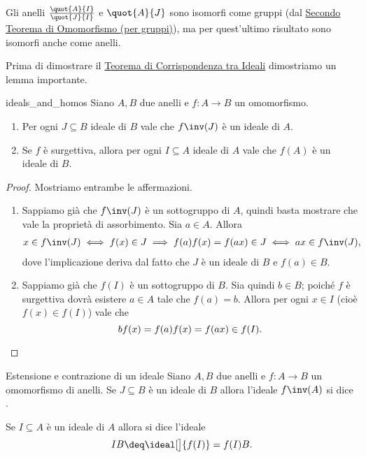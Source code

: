 \begin{remark}
    Gli anelli $\frac{\quot{A}{I}}{\quot{J}{I}}$ e $\quot{A}{J}$ sono isomorfi come gruppi (dal \hyperref[th:second_iso]{Secondo Teorema di Omomorfismo (per gruppi)}), ma per quest'ultimo risultato sono isomorfi anche come anelli.
\end{remark}

Prima di dimostrare il \hyperref[th:ideal_corr]{Teorema di Corrispondenza tra Ideali} dimostriamo un lemma importante.
\begin{lemma}{}
    {ideals_and_homos}
    Siano $A, B$ due anelli e $f : A \to B$ un omomorfismo.
    \begin{enumerate}[label={(\arabic*)}]
        \item Per ogni $J \subseteq B$ ideale di $B$ vale che $f\inv(J)$ è un ideale di $A$.
        \item Se $f$ è surgettiva, allora per ogni $I \subseteq A$ ideale di $A$ vale che $f(A)$ è un ideale di $B$.
    \end{enumerate}
\end{lemma}
\begin{proof}
    Mostriamo entrambe le affermazioni.
    \begin{enumerate}[label={(\arabic*)}]
        \item Sappiamo già che $f\inv(J)$ è un sottogruppo di $A$, quindi basta mostrare che vale la proprietà di assorbimento. Sia $a \in A$. Allora \begin{align*}
            x \in f\inv(J) %
            \iff f(x) \in J %
            \implies f(a)f(x) = f(ax) \in J %
            \iff ax \in f\inv(J),
        \end{align*} dove l'implicazione deriva dal fatto che $J$ è un ideale di $B$ e $f(a) \in B$.
        \item Sappiamo già che $f(I)$ è un sottogruppo di $B$. Sia quindi $b \in B$; poiché $f$ è surgettiva dovrà esistere $a \in A$ tale che $f(a) = b$. Allora per ogni $x \in I$ (cioè $f(x) \in f(I)$) vale che \[
            bf(x) = f(a)f(x) = f(ax) \in f(I). \qedhere    
        \]
    \end{enumerate}
\end{proof}

\begin{definition}
    {Estensione e contrazione di un ideale}
    Siano $A, B$ due anelli e $f : A \to B$ un omomorfismo di anelli. Se $J \subseteq B$ è un ideale di $B$ allora l'ideale $f\inv(A)$ si dice .
    
    Se $I \subseteq A$ è un ideale di $A$ allora si dice  l'ideale \[
        IB \deq \ideal[\big]{f(I)} = f(I)B.    
    \]
\end{definition}

